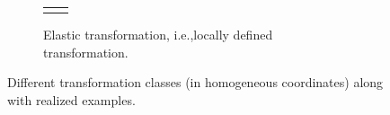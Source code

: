 \begin{figure}
\begin{subfigure}{\linewidth}
\begin{tabular}{>{\centering}p{4cm}c}
{{				}
			}
			\)
		\end{tabular}
		\caption{Elastic transformation, i.e.,locally defined transformation.} \label{fig:elastictransformation}
	\end{subfigure}
	\caption[Compact Routing Example]{Different transformation classes (in homogeneous coordinates) along with realized examples.}
	\label{fig:transformations}
\end{figure}
